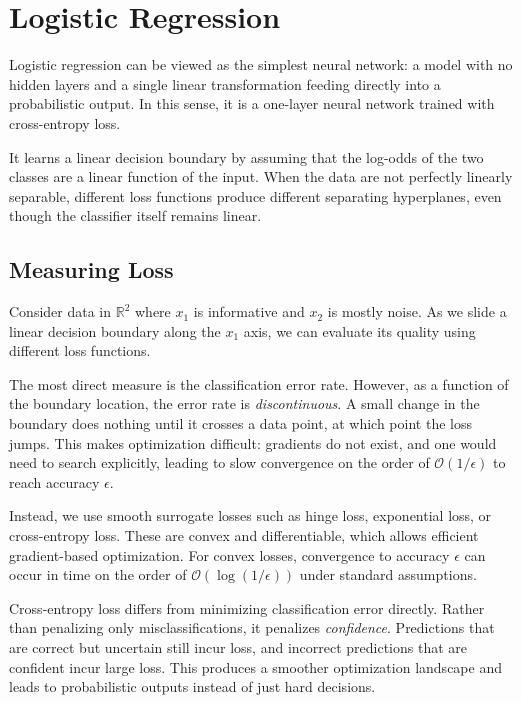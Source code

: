 \section{Logistic Regression}

\medskip

Logistic regression can be viewed as the simplest neural network: a model with no hidden layers and a single linear transformation feeding directly into a probabilistic output. In this sense, it is a one-layer neural network trained with cross-entropy loss.

It learns a linear decision boundary by assuming that the log-odds of the two classes are a linear function of the input. When the data are not perfectly linearly separable, different loss functions produce different separating hyperplanes, even though the classifier itself remains linear.

\bigskip

\subsection{Measuring Loss}

\medskip

Consider data in $\mathbb{R}^2$ where $x_1$ is informative and $x_2$ is mostly noise. As we slide a linear decision boundary along the $x_1$ axis, we can evaluate its quality using different loss functions.

The most direct measure is the classification error rate. However, as a function of the boundary location, the error rate is \emph{discontinuous}. A small change in the boundary does nothing until it crosses a data point, at which point the loss jumps. This makes optimization difficult: gradients do not exist, and one would need to search explicitly, leading to slow convergence on the order of $\mathcal{O}(1/\epsilon)$ to reach accuracy $\epsilon$.

Instead, we use smooth surrogate losses such as hinge loss, exponential loss, or cross-entropy loss. These are convex and differentiable, which allows efficient gradient-based optimization. For convex losses, convergence to accuracy $\epsilon$ can occur in time on the order of $\mathcal{O}(\log(1/\epsilon))$ under standard assumptions.

Cross-entropy loss differs from minimizing classification error directly. Rather than penalizing only misclassifications, it penalizes \emph{confidence}. Predictions that are correct but uncertain still incur loss, and incorrect predictions that are confident incur large loss. This produces a smoother optimization landscape and leads to probabilistic outputs instead of just hard decisions.

